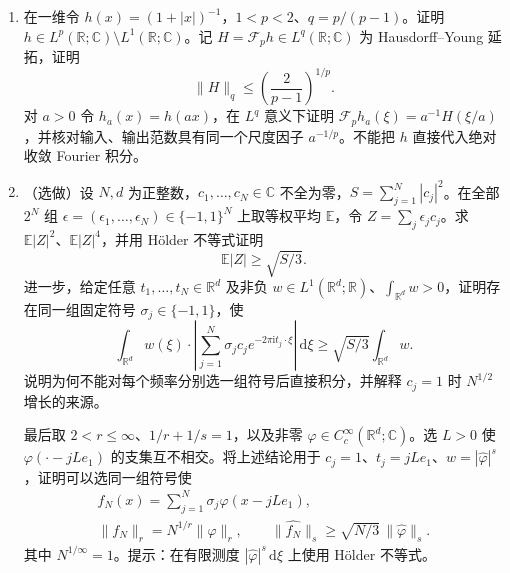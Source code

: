 \begin{exercise}\label{b2:ex:04-interpolation-sign-moments}
\begin{enumerate}
\item\label{b2:item:04-hy-nongaussian-scaling} 在一维令 \(h(x)=(1+|x|)^{-1}\)，\(1<p<2\)、\(q=p/(p-1)\)。证明 \(h\in L^p(\mathbb R;\mathbb C)\setminus L^1(\mathbb R;\mathbb C)\)。记 \(H=\mathcal F_ph\in L^q(\mathbb R;\mathbb C)\) 为 Hausdorff--Young 延拓，证明
\[
 \|H\|_q\leq\left(\frac2{p-1}\right)^{1/p}.
\]
对 \(a>0\) 令 \(h_a(x)=h(ax)\)，在 \(L^q\) 意义下证明 \(\mathcal F_ph_a(\xi)=a^{-1}H(\xi/a)\)，并核对输入、输出范数具有同一个尺度因子 \(a^{-1/p}\)。不能把 \(h\) 直接代入绝对收敛 Fourier 积分。
\item\label{b2:item:04-weighted-sign-moments} （选做）设 \(N,d\) 为正整数，\(c_1,\ldots,c_N\in\mathbb C\) 不全为零，\(S=\sum_{j=1}^N|c_j|^2\)。在全部 \(2^N\) 组 \(\epsilon=(\epsilon_1,\ldots,\epsilon_N)\in\{-1,1\}^N\) 上取等权平均 \(\mathbb E\)，令 \(Z=\sum_j\epsilon_jc_j\)。求 \(\mathbb E|Z|^2\)、\(\mathbb E|Z|^4\)，并用 Hölder 不等式证明
\[
 \mathbb E|Z|\geq\sqrt{S/3}.
\]
进一步，给定任意 \(t_1,\ldots,t_N\in\mathbb R^d\) 及非负 \(w\in L^1(\mathbb R^d;\mathbb R)\)、\(\int_{\mathbb R^d}w>0\)，证明存在同一组固定符号 \(\sigma_j\in\{-1,1\}\)，使
\[
 \int_{\mathbb R^d}w(\xi)\cdot
 \left|\sum_{j=1}^N\sigma_jc_je^{-2\pi\mathrm i t_j\cdot\xi}\right|\,\mathrm d\xi
 \geq\sqrt{S/3}\int_{\mathbb R^d}w.
\]
说明为何不能对每个频率分别选一组符号后直接积分，并解释 \(c_j=1\) 时 \(N^{1/2}\) 增长的来源。

最后取 \(2<r\leq\infty\)、\(1/r+1/s=1\)，以及非零 \(\varphi\in C_c^\infty(\mathbb R^d;\mathbb C)\)。选 \(L>0\) 使 \(\varphi(\cdot-jLe_1)\) 的支集互不相交。将上述结论用于 \(c_j=1\)、\(t_j=jLe_1\)、\(w=|\widehat\varphi|^s\)，证明可以选同一组符号使
\[
 \begin{gathered}
 f_N(x)=\sum_{j=1}^N\sigma_j\varphi(x-jLe_1),\\
 \|f_N\|_r=N^{1/r}\|\varphi\|_r,\qquad
 \|\widehat {f_N}\|_s\geq\sqrt{N/3}\,\|\widehat\varphi\|_s.
 \end{gathered}
\]
其中 \(N^{1/\infty}=1\)。提示：在有限测度 \(|\widehat\varphi|^s\,\mathrm d\xi\) 上使用 Hölder 不等式。
\end{enumerate}
\end{exercise}
